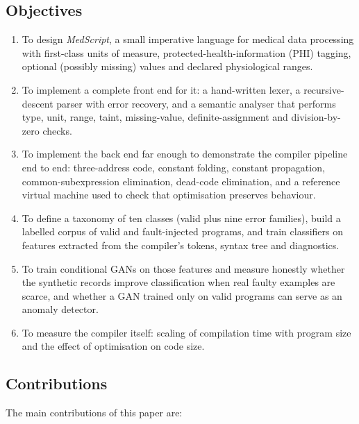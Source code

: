 \documentclass[conference]{IEEEtran}
\begin{document}
\subsection{Objectives}

\begin{enumerate}
    \item To design \emph{MedScript}, a small imperative language for medical data processing with first-class
    units of measure, protected-health-information (PHI) tagging, optional (possibly missing) values and
    declared physiological ranges.
    \item To implement a complete front end for it: a hand-written lexer, a recursive-descent parser with error
    recovery, and a semantic analyser that performs type, unit, range, taint, missing-value, definite-assignment
    and division-by-zero checks.
    \item To implement the back end far enough to demonstrate the compiler pipeline end to end: three-address
    code, constant folding, constant propagation, common-subexpression elimination, dead-code elimination, and a
    reference virtual machine used to check that optimisation preserves behaviour.
    \item To define a taxonomy of ten classes (valid plus nine error families), build a labelled corpus of valid and fault-injected
    programs, and train classifiers on features extracted from the compiler's tokens, syntax tree and
    diagnostics.
    \item To train conditional GANs on those features and measure honestly whether the synthetic records improve
    classification when real faulty examples are scarce, and whether a GAN trained only on valid programs can
    serve as an anomaly detector.
    \item To measure the compiler itself: scaling of compilation time with program size and the effect of
    optimisation on code size.
\end{enumerate}

\subsection{Contributions}

The main contributions of this paper are:
\end{document}
